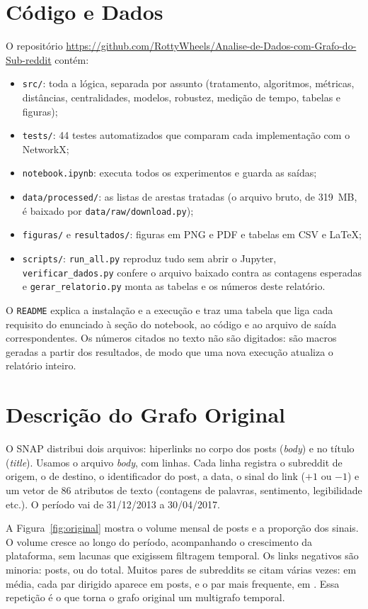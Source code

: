 \IfFileExists{webmedia.cls}{\webmediatrue\documentclass[sigconf]{webmedia}}{\documentclass[sigconf]{acmart}}
\newcommand{\repo}{\url{https://github.com/RottyWheels/Analise-de-Dados-com-Grafo-do-Sub-reddit}}
\begin{document}
\section{Código e Dados}
O repositório \repo{} contém:
\begin{itemize}
  \item \texttt{src/}: toda a lógica, separada por assunto (tratamento, algoritmos, métricas,
    distâncias, centralidades, modelos, robustez, medição de tempo, tabelas e figuras);
  \item \texttt{tests/}: 44 testes automatizados que comparam cada implementação com o NetworkX;
  \item \texttt{notebook.ipynb}: executa todos os experimentos e guarda as saídas;
  \item \texttt{data/processed/}: as listas de arestas tratadas (o arquivo bruto, de 319~MB, é baixado
    por \texttt{data/raw/download.py});
  \item \texttt{figuras/} e \texttt{resultados/}: figuras em PNG e PDF e tabelas em CSV e \LaTeX;
  \item \texttt{scripts/}: \texttt{run\_all.py} reproduz tudo sem abrir o Jupyter,
    \texttt{verificar\_dados.py} confere o arquivo baixado contra as contagens esperadas e
    \texttt{gerar\_relatorio.py} monta as tabelas e os números deste relatório.
\end{itemize}
O \texttt{README} explica a instalação e a execução e traz uma tabela que liga cada requisito do
enunciado à seção do notebook, ao código e ao arquivo de saída correspondentes. Os números citados no
texto não são digitados: são macros geradas a partir dos resultados, de modo que uma nova execução
atualiza o relatório inteiro.

\section{Descrição do Grafo Original}
O SNAP distribui dois arquivos: hiperlinks no corpo dos posts (\emph{body}) e no título (\emph{title}).
Usamos o arquivo \emph{body}, com \postsTotal{} linhas. Cada linha registra o subreddit de origem, o de
destino, o identificador do post, a data, o sinal do link ($+1$ ou $-1$) e um vetor de 86 atributos
de texto (contagens de palavras, sentimento, legibilidade etc.). O período vai de 31/12/2013 a
30/04/2017.

A Figura~\ref{fig:original} mostra o volume mensal de posts e a proporção dos sinais. O volume cresce
ao longo do período, acompanhando o crescimento da plataforma, sem lacunas que exigissem filtragem
temporal. Os links negativos são minoria: \linksNeg{} posts, ou \fracNeg{} do total. Muitos pares de
subreddits se citam várias vezes: em média, cada par dirigido aparece em \postsPorPar{} posts, e o par
mais frequente, em \postsPorParMax. Essa repetição é o que torna o grafo original um multigrafo
temporal.
\end{document}
